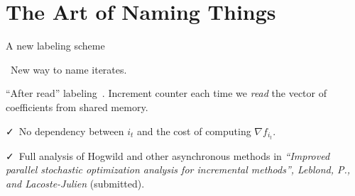 \documentclass[10pt]{beamer}
\let\oldparencite=\parencite
\renewcommand{\parencite}[1]{\textcolor[rgb]{.7,.7,.7}{\oldparencite{#1}}}
\begin{document}
{
\section{The Art of {Naming \color{mDarkTeal} Things}}
}


\begin{frame}{A new labeling scheme}

{\Large\faLightbulbO}~New way to name iterates.

\pause
\vspace{1em}
``After read'' labeling~\parencite{leblond2016Asaga}. Increment counter each time we \emph{read} the vector of coefficients from shared memory.

\pause
{\Large \faCheck}~No dependency between $i_t$ and the cost of computing $\nabla f_{i_t}$.

{\Large \faCheck}~Full analysis of Hogwild and other asynchronous methods in \emph{``Improved parallel stochastic optimization analysis for
incremental methods'', Leblond, P., and Lacoste-Julien} (submitted).
\end{frame}
\end{document}
